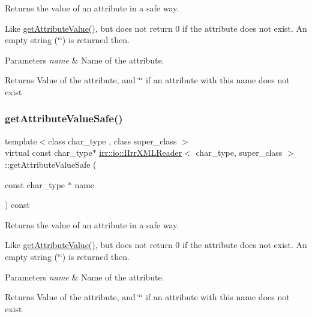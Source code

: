 Returns the value of an attribute in a safe way. 

Like \hyperlink{classirr_1_1io_1_1IIrrXMLReader_a41bd71a1b9d4a80cd1d0257dedb35325}{get\+Attribute\+Value()}, but does not return 0 if the attribute does not exist. An empty string (\char`\"{}\char`\"{}) is returned then. 
\begin{DoxyParams}{Parameters}
{\em name} & Name of the attribute. \\
\hline
\end{DoxyParams}
\begin{DoxyReturn}{Returns}
Value of the attribute, and \char`\"{}\char`\"{} if an attribute with this name does not exist 
\end{DoxyReturn}
\mbox{\label{classirr_1_1io_1_1IIrrXMLReader_a7674852b2e24b2710b90aab10ef1fc22}} 
\subsubsection{\texorpdfstring{get\+Attribute\+Value\+Safe()}{getAttributeValueSafe()}\hspace{0.1cm}{\footnotesize\ttfamily [2/2]}}
{\footnotesize\ttfamily template$<$class char\+\_\+type , class super\+\_\+class $>$ \\
virtual const char\+\_\+type$\ast$ \hyperlink{classirr_1_1io_1_1IIrrXMLReader}{irr\+::io\+::\+I\+Irr\+X\+M\+L\+Reader}$<$ char\+\_\+type, super\+\_\+class $>$\+::get\+Attribute\+Value\+Safe (\begin{DoxyParamCaption}\item[{const char\+\_\+type $\ast$}]{name }\end{DoxyParamCaption}) const\hspace{0.3cm}{\ttfamily [pure virtual]}}



Returns the value of an attribute in a safe way. 

Like \hyperlink{classirr_1_1io_1_1IIrrXMLReader_a41bd71a1b9d4a80cd1d0257dedb35325}{get\+Attribute\+Value()}, but does not return 0 if the attribute does not exist. An empty string (\char`\"{}\char`\"{}) is returned then. 
\begin{DoxyParams}{Parameters}
{\em name} & Name of the attribute. \\
\hline
\end{DoxyParams}
\begin{DoxyReturn}{Returns}
Value of the attribute, and \char`\"{}\char`\"{} if an attribute with this name does not exist 
\end{DoxyReturn}
\mbox{\label{classirr_1_1io_1_1IIrrXMLReader_aecbe0698e8f9acf88e27dd53da984210}} 

